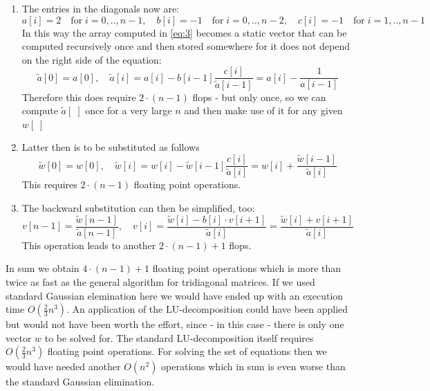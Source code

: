 \documentclass[11pt,a4wide]{article}
\begin{document}
\begin{enumerate}
	\item The entries in the diagonals now are:
	\begin{equation}
	a[i]=2\quad \text{for}\; i=0,..,n-1,\quad	b[i]=-1\quad \text{for}\; i=0,..,n-2,\quad	c[i]=-1\quad \text{for}\; i=1,..,n-1
	\label{eq:6}
	\end{equation}
	In this way the array computed in \ref{eq:3} becomes a static vector that can be computed recursively once and then stored somewhere for it does not depend on the right side of the equation:
	\begin{equation}
	\tilde{a}[0]=a[0],\quad \tilde{a}[i]=a[i]-b[i-1]\dfrac{c[i]}{\tilde{a}[i-1]}=a[i]-\dfrac{1}{a[i-1]}
	\label{eq:7}
	\end{equation}
	Therefore this does require $2\cdot (n-1)$ flops -  but only once, so we can compute $\tilde{a}[\;]$ once for a very large $n$ and then make use of it for any given $w[\;]$ 
	\item Latter then is to be substituted as follows
	\begin{equation}
	\tilde{w}[0]=w[0],\quad \tilde{w}[i]=w[i]-\tilde{w}[i-1]\dfrac{c[i]}{\tilde{a}[i]}=	w[i]+\dfrac{\tilde{w}[i-1]}{\tilde{a}[i]}
	\label{eq:4}
		\end{equation}
	This requires $2\cdot(n-1)$ floating point operations.
	\item The backward substitution can then be simplified, too:
		\begin{equation}
	v[n-1]=\dfrac{\tilde{w}[n-1]}{\tilde{a}[n-1]},\quad v[i]=\dfrac{\tilde{w}[i]-b[i]\cdot v[i+1]}{\tilde{a}[i]}=\dfrac{\tilde{w}[i]+v[i+1]}{\tilde{a}[i]}
	\label{eq:5}
	\end{equation}
	This operation leads to another $2\cdot(n-1)+1$ flops.
\end{enumerate}
In sum we obtain $4\cdot(n-1)+1$ floating point operations which is more than twice as fast as the general algorithm for tridiagonal matrices. If we used standard Gaussian elemination here we would have ended up with an execution time $O(\frac{2}{3}n^3)$. An application of the LU-decomposition could have been applied but would not have been worth the effort, since - in this case - there is only one vector $w$ to be solved for. The standard LU-decomposition itself requires $O(\frac{2}{3}n^3)$ floating point operations. For solving the set of equations then we would have needed another $O(n^2)$ operations which in sum is even worse than the standard Gaussian elimination.
\end{document}
